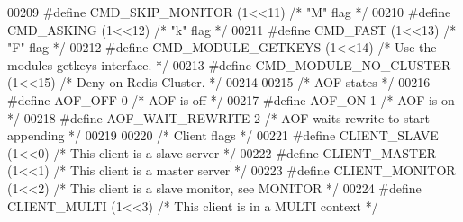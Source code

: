 \begin{DoxyCode}
{{{{{{00209 \textcolor{preprocessor}{#}\textcolor{preprocessor}{define} \textcolor{preprocessor}{CMD\_SKIP\_MONITOR} \textcolor{preprocessor}{(}1\textcolor{preprocessor}{<<}11\textcolor{preprocessor}{)}    \textcolor{comment}{/* "M" flag */}
00210 \textcolor{preprocessor}{#}\textcolor{preprocessor}{define} \textcolor{preprocessor}{CMD\_ASKING} \textcolor{preprocessor}{(}1\textcolor{preprocessor}{<<}12\textcolor{preprocessor}{)}          \textcolor{comment}{/* "k" flag */}
00211 \textcolor{preprocessor}{#}\textcolor{preprocessor}{define} \textcolor{preprocessor}{CMD\_FAST} \textcolor{preprocessor}{(}1\textcolor{preprocessor}{<<}13\textcolor{preprocessor}{)}            \textcolor{comment}{/* "F" flag */}
00212 \textcolor{preprocessor}{#}\textcolor{preprocessor}{define} \textcolor{preprocessor}{CMD\_MODULE\_GETKEYS} \textcolor{preprocessor}{(}1\textcolor{preprocessor}{<<}14\textcolor{preprocessor}{)}  \textcolor{comment}{/* Use the modules getkeys interface. */}
00213 \textcolor{preprocessor}{#}\textcolor{preprocessor}{define} \textcolor{preprocessor}{CMD\_MODULE\_NO\_CLUSTER} \textcolor{preprocessor}{(}1\textcolor{preprocessor}{<<}15\textcolor{preprocessor}{)} \textcolor{comment}{/* Deny on Redis Cluster. */}
00214 
00215 \textcolor{comment}{/* AOF states */}
00216 \textcolor{preprocessor}{#}\textcolor{preprocessor}{define} \textcolor{preprocessor}{AOF\_OFF} 0             \textcolor{comment}{/* AOF is off */}
00217 \textcolor{preprocessor}{#}\textcolor{preprocessor}{define} \textcolor{preprocessor}{AOF\_ON} 1              \textcolor{comment}{/* AOF is on */}
00218 \textcolor{preprocessor}{#}\textcolor{preprocessor}{define} \textcolor{preprocessor}{AOF\_WAIT\_REWRITE} 2    \textcolor{comment}{/* AOF waits rewrite to start appending */}
00219 
00220 \textcolor{comment}{/* Client flags */}
00221 \textcolor{preprocessor}{#}\textcolor{preprocessor}{define} \textcolor{preprocessor}{CLIENT\_SLAVE} \textcolor{preprocessor}{(}1\textcolor{preprocessor}{<<}0\textcolor{preprocessor}{)}   \textcolor{comment}{/* This client is a slave server */}
00222 \textcolor{preprocessor}{#}\textcolor{preprocessor}{define} \textcolor{preprocessor}{CLIENT\_MASTER} \textcolor{preprocessor}{(}1\textcolor{preprocessor}{<<}1\textcolor{preprocessor}{)}  \textcolor{comment}{/* This client is a master server */}
00223 \textcolor{preprocessor}{#}\textcolor{preprocessor}{define} \textcolor{preprocessor}{CLIENT\_MONITOR} \textcolor{preprocessor}{(}1\textcolor{preprocessor}{<<}2\textcolor{preprocessor}{)} \textcolor{comment}{/* This client is a slave monitor, see MONITOR */}
00224 \textcolor{preprocessor}{#}\textcolor{preprocessor}{define} \textcolor{preprocessor}{CLIENT\_MULTI} \textcolor{preprocessor}{(}1\textcolor{preprocessor}{<<}3\textcolor{preprocessor}{)}   \textcolor{comment}{/* This client is in a MULTI context */}
}}}}}}
\end{DoxyCode}
